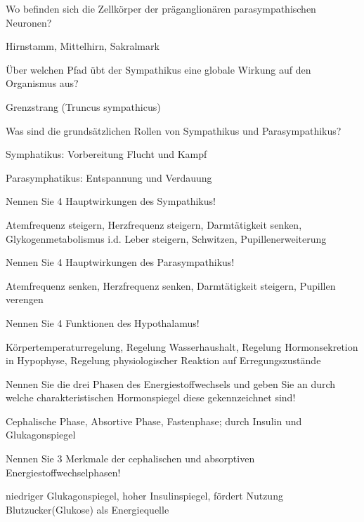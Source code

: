 \documentclass[10pt, a4paper]{exam}
\newcommand\Warning{%
 \makebox[1.4em][c]{%
 \makebox[0pt][c]{\raisebox{.1em}{\small!}}%
 \makebox[0pt][c]{\color{red}\Large$\bigtriangleup$}}}%
\begin{document}
\begin{questions}
  \question Wo befinden sich die Zellkörper der präganglionären parasympathischen Neuronen?
  \begin{solution}
    Hirnstamm, Mittelhirn, Sakralmark
  \end{solution}

  \question Über welchen Pfad übt der Sympathikus eine globale Wirkung auf den Organismus aus?
  \begin{solution}
    Grenzstrang (Truncus sympathicus) \Warning
  \end{solution}

  \question Was sind die grundsätzlichen Rollen von Sympathikus und Parasympathikus?
  \begin{solution}
    \begin{itemize*}
      \item Symphatikus: Vorbereitung Flucht und Kampf
      \item Parasymphatikus: Entspannung und Verdauung
    \end{itemize*}
  \end{solution}

  \question Nennen Sie 4 Hauptwirkungen des Sympathikus!
  \begin{solution}
    Atemfrequenz steigern, Herzfrequenz steigern, Darmtätigkeit senken, Glykogenmetabolismus i.d. Leber steigern, Schwitzen, Pupillenerweiterung
  \end{solution}

  \question Nennen Sie 4 Hauptwirkungen des Parasympathikus!
  \begin{solution}
    Atemfrequenz senken, Herzfrequenz senken, Darmtätigkeit steigern, Pupillen verengen
  \end{solution}

  \question Nennen Sie 4 Funktionen des Hypothalamus!
  \begin{solution}
    Körpertemperaturregelung, Regelung Wasserhaushalt, Regelung Hormonsekretion in Hypophyse, Regelung physiologischer Reaktion auf Erregungszustände
  \end{solution}

  \question Nennen Sie die drei Phasen des Energiestoffwechsels und geben Sie an durch welche charakteristischen Hormonspiegel diese gekennzeichnet sind!
  \begin{solution}
    Cephalische Phase, Absortive Phase, Fastenphase; durch Insulin und Glukagonspiegel
  \end{solution}

  \question Nennen Sie 3 Merkmale der cephalischen und absorptiven Energiestoffwechselphasen!
  \begin{solution}
    niedriger Glukagonspiegel, hoher Insulinspiegel, fördert Nutzung Blutzucker(Glukose) als Energiequelle
  \end{solution}


\end{questions}
\end{document}

